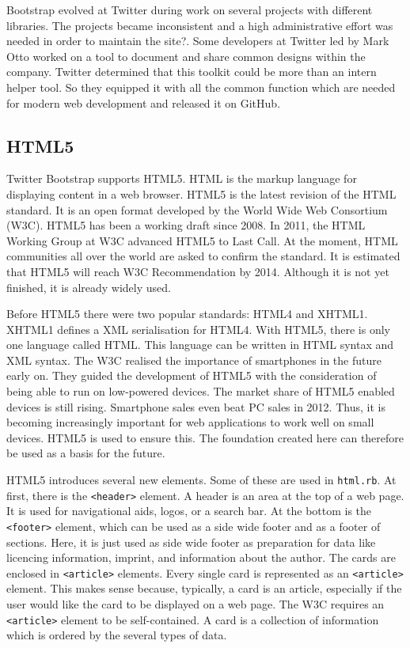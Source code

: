 Bootstrap evolved at Twitter during work on several projects with different libraries. The projects became inconsistent and a high administrative effort was needed in order to maintain the site?. Some developers at Twitter led by Mark Otto worked on a tool to document and share common designs within the company. Twitter determined that this toolkit could be more than an intern helper tool. So they equipped it with all the common function which are needed for modern web development and released it on GitHub. \cite{markotto}

\subsection{HTML5}
Twitter Bootstrap supports HTML5. HTML is the markup language for displaying content in a web browser. HTML5 is the latest revision of the HTML standard. It is an open format developed by the World Wide Web Consortium (W3C). HTML5 has been a working draft since 2008. In 2011, the HTML Working Group at W3C advanced HTML5 to Last Call. At the moment, HTML communities all over the world are asked to confirm the standard.  It is estimated that HTML5 will reach W3C Recommendation by 2014.\cite{html:lastcall} Although it is not yet finished, it is already widely used.

Before HTML5 there were two popular standards: HTML4 and XHTML1. XHTML1 defines a XML serialisation for HTML4. With HTML5, there is only one language called HTML. This language can be written in HTML syntax and XML syntax. 
\cite{html:5differences} The W3C realised the importance of smartphones in the future early on. They guided the development of HTML5 with the consideration of being able to run on low-powered devices. The market share of HTML5 enabled devices is still rising. \cite{smartphonesales} Smartphone sales even beat PC sales in 2012. Thus, it is becoming increasingly important for web applications to work well on small devices. HTML5 is used to ensure this. The foundation created here can therefore be used as a basis for the future.

HTML5 introduces several new elements. Some of these are used in \texttt{html.rb}. At first, there is the \lstinline{<header>} element. A header is an area at the top of a web page. It is used for navigational aids, logos, or a search bar. \cite{html5:header} At the bottom is the \lstinline{<footer>} element, which can be used as a side wide footer and as a footer of sections. \cite{html5:footer} Here, it is just used as side wide footer as preparation for data like licencing information, imprint, and information about the author. The cards are enclosed in \lstinline{<article>} elements. Every single card is represented as an \lstinline{<article>} element. This makes sense because, typically, a card is an article, especially if the user would like the card to be displayed on a web page. The W3C requires an \lstinline{<article>} element to be self-contained. \cite{html5:article} A card is a collection of information which is ordered by the several types of data. 

